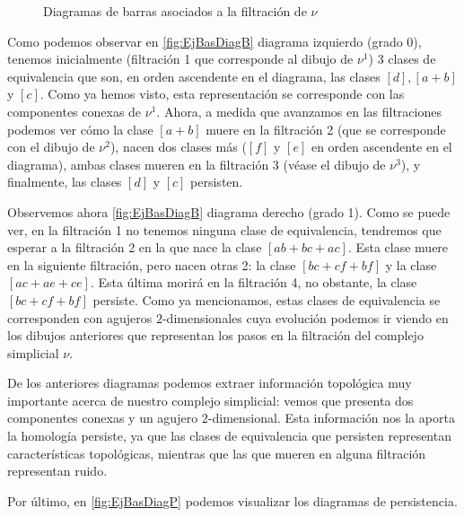 \documentclass[12pt, a4paper, twoside]{book}
\numberwithin{equation}{section}
\theoremstyle{definition}
\newenvironment{ejem}
  {\pushQED{\qed}\renewcommand{\qedsymbol}{$\blacktriangleleft$}\ejemplo}
  {\popQED\endejemplo}
\theoremstyle{remark}
\theoremstyle{plain}
\begin{document}
\begin{ejem}
\begin{figure}[!htbp]
{\begin{figure}[H]
{}
			\end{figure}	
		\endminipage}
		\caption{Diagramas de barras asociados a la filtración de 
		{\Large $\nu$}}
		\label{fig:EjBasDiagB}
	\end{figure}

	Como podemos observar en \autoref{fig:EjBasDiagB} diagrama izquierdo 
	(grado 0), 
	tenemos inicialmente (filtración 1 que corresponde al dibujo de 
	{\Large $\nu$}$^{1}$) 3 clases de equivalencia que son, en orden 
	ascendente 
	en el diagrama, las clases $[d],[a+b]$ y $[c]$. Como ya hemos visto, 
	esta representación se corresponde con las componentes conexas de 
	{\Large $\nu$}$^{1}$. Ahora, a medida que avanzamos en las 
	filtraciones podemos ver cómo la clase $[a+b]$ muere en la filtración 2
	(que se corresponde con el dibujo de {\Large $\nu$}$^{2}$), nacen dos 
	clases más ($[f]$ y $[e]$ en orden ascendente en el diagrama), ambas 
	clases mueren en la filtración 3 (véase el dibujo de 
	{\Large $\nu$}$^{3}$), y finalmente, las clases $[d]$ y $[c]$ 
	persisten.
	
	Observemos ahora \autoref{fig:EjBasDiagB} diagrama derecho (grado 1). 
	Como se puede 
	ver, en la filtración 1 no tenemos ninguna clase de equivalencia, 
	tendremos que esperar a la filtración 2 en la que nace la clase 
	$[ab+bc+ac]$. Esta clase muere en la siguiente filtración, pero nacen 
	otras 2: la clase $[bc+cf+bf]$ y la clase $[ac+ae+ce]$. Esta última 
	morirá en la filtración 4, no obstante, la clase $[bc+cf+bf]$ 
	persiste. Como ya mencionamos, estas clases de equivalencia se 
	corresponden con agujeros $2$-dimensionales cuya evolución podemos ir
	viendo en los dibujos anteriores que representan los pasos en la 
	filtración del complejo simplicial {\Large $\nu$}.

	De los anteriores diagramas podemos extraer información topológica 
	muy importante acerca de nuestro complejo simplicial: vemos que 
	presenta dos componentes conexas y un agujero $2$-dimensional. Esta 
	información nos la aporta la homología persiste, ya que las clases de 
	equivalencia que persisten representan características topológicas, 
	mientras que las que mueren en alguna filtración representan ruido.

	Por último, en \autoref{fig:EjBasDiagP} podemos visualizar los 
	diagramas de persistencia.
	\begin{figure}[!htbp]
\end{figure}
\end{ejem}
\end{document}
